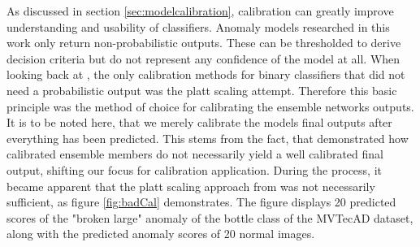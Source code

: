 As discussed in section \ref{sec:modelcalibration}, calibration can greatly improve understanding and usability of classifiers. Anomaly models researched in this work only return non-probabilistic 
outputs. These can be thresholded to derive decision criteria but do not represent any confidence of the model at all. When looking back at \cite{Guo_2017_tempscalingetc}, the only calibration 
methods for binary classifiers that did not need a probabilistic output was the platt scaling attempt. Therefore this basic principle was the method of choice for calibrating the ensemble networks 
outputs. It is to be noted here, that we merely calibrate the models final outputs after everything has been predicted. This stems from the fact, that \cite{Wu_2021_shouldbecalibrated} demonstrated 
how calibrated ensemble members do not necessarily yield a well calibrated final output, shifting our focus for calibration application. During the process, it became apparent that the platt 
scaling approach from \cite{Guo_2017_tempscalingetc} was not necessarily sufficient, as figure \ref{fig:badCal} demonstrates. The figure displays 20 predicted scores of the "broken large" anomaly of the bottle class of the MVTecAD dataset, 
along with the predicted anomaly scores of 20 normal images.

